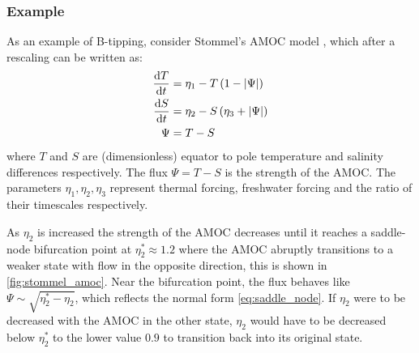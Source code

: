 \subsubsection{Example}
As an example of B-tipping, consider Stommel's AMOC model \parencite{STOMMEL1961}, which after a rescaling \parencite{Dijkstra2011} can be written as:
\begin{subequations}
  \label{eq:stommel_amoc}
  \begin{align}
    \dv{T}{t} &= \eta_1 - T\left(1 - \left|\Psi\right|\right) \\
    \dv{S}{t} &= \eta_2 - S\left(\eta_3 + \left|\Psi\right|\right) \\
    \Psi      &= T - S
  \end{align}
\end{subequations}
where $T$ and $S$ are (dimensionless) equator to pole temperature and salinity differences respectively.
The flux $\Psi = T - S$ is the strength of the AMOC. The parameters $\eta_1,\eta_2,\eta_3$ represent
thermal forcing, freshwater forcing and the ratio of their timescales respectively.

As $\eta_2$ is increased the strength of the AMOC decreases until it reaches a saddle-node bifurcation point
at $\eta_2^*  \approx 1.2$ where the AMOC abruptly transitions to a weaker state with flow in the opposite direction,
this is shown in \cref{fig:stommel_amoc}. Near the bifurcation point, the flux behaves like $\Psi \sim \sqrt{\eta_2^*-\eta_2}$,
which reflects the normal form \cref{eq:saddle_node}. If $\eta_2$ were to be decreased with the AMOC in the other state, $\eta_2$ would have to be decreased below
$\eta_2^*$ to the lower value $0.9$ to transition back into its original state.


